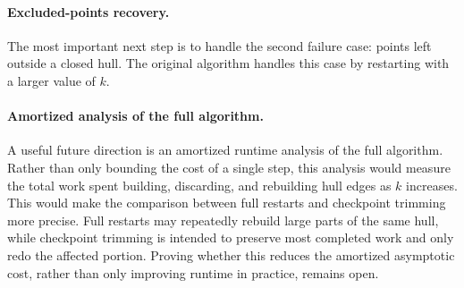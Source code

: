 \documentclass[10pt,twocolumn]{article}
\begin{document}
\paragraph{Excluded-points recovery.} The most important next step is to handle the second failure case: points left outside a closed hull. The original algorithm handles this case by restarting with a larger value of \(k\).


\paragraph{Amortized analysis of the full algorithm.} A useful future direction is an amortized runtime analysis of the full algorithm. Rather than only bounding the cost of a single step, this analysis would measure the total work spent building, discarding, and rebuilding hull edges as \(k\) increases. This would make the comparison between full restarts and checkpoint trimming more precise. Full restarts may repeatedly rebuild large parts of the same hull, while checkpoint trimming is intended to preserve most completed work and only redo the affected portion. Proving whether this reduces the amortized asymptotic cost, rather than only improving runtime in practice, remains open.

\end{document}
